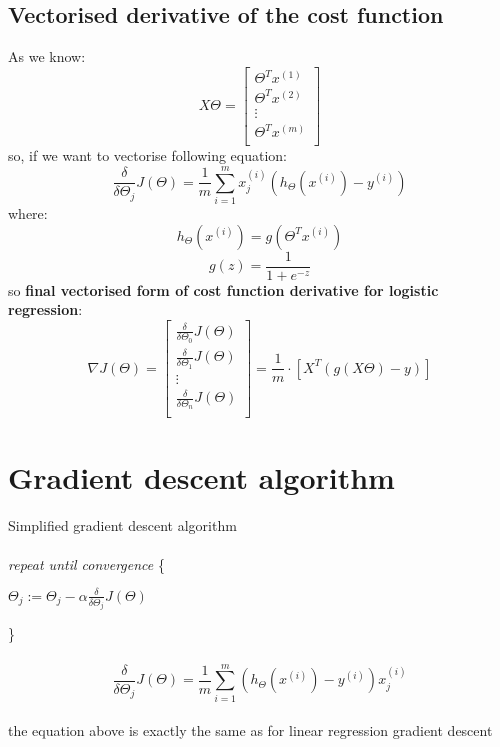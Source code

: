 \documentclass{article} %
\begin{document}
\subsection{Vectorised derivative of the cost function} 
As we know:
\begin{equation*}
X \Theta = 
\begin{bmatrix} 
\Theta^Tx^{(1)} \\ 
\Theta^Tx^{(2)} \\
\vdots \\
\Theta^Tx^{(m)}\\
\end{bmatrix}  
\end{equation*}
so, if we want to vectorise following equation:
\begin{equation}
\frac{\delta}{\delta\Theta_j}J(\Theta) = \frac{1}{m} \sum_{i=1}^m x_j^{(i)}(h_\Theta(x^{(i)}) - y^{(i)}) 
\end{equation}
where:
\begin{equation*}
h_{\Theta}(x^{(i)}) = g(\Theta^Tx^{(i)})
\end{equation*}
\begin{equation*} 
g(z) = \frac{1}{1 + e^{-z}}  
\end{equation*}
so \textbf{final vectorised form of cost function derivative for logistic regression}:
\color{red}
\begin{equation}
\nabla J(\Theta) = 
\begin{bmatrix} 
\frac{\delta}{\delta\Theta_0}J(\Theta)\\ 
\frac{\delta}{\delta\Theta_1}J(\Theta) \\
\vdots \\
\frac{\delta}{\delta\Theta_n}J(\Theta)\\
\end{bmatrix}  
= \frac{1}{m}\cdot
\left[X^T(g(X\Theta)-y)\right]
\end{equation}
\color{black}
\newline
\newline

\section{Gradient descent algorithm}
Simplified gradient descent algorithm\\
\\
\textit{repeat until convergence} \{
\begin{tabbing}
\hspace{1cm}$\Theta_j:=  \Theta_j  -  \alpha  \frac{\delta}{\delta\Theta_j}J(\Theta)$
\end{tabbing}
\}\\
\\
\begin{equation}
\frac{\delta}{\delta\Theta_j}J(\Theta) = \frac{1}{m} \sum_{i=1}^m (h_\Theta(x^{(i)}) - y^{(i)}) x_j^{(i)}
\end{equation}
\\
the equation above is exactly the same as for linear regression gradient descent   
\end{document}
